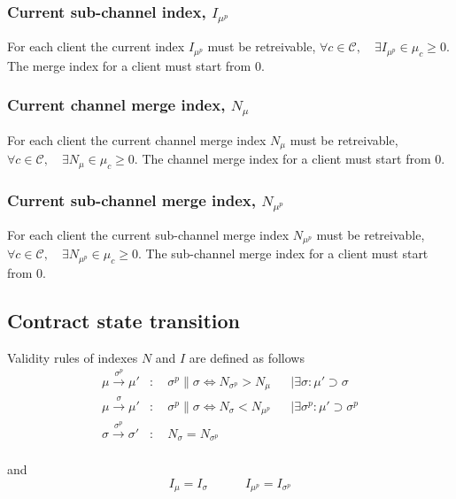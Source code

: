 \documentclass{llncs}
\begin{document}
\subsubsection{Current sub-channel index, $I_{\mu^p}$} For each client the current index $I_{\mu^p}$ must be retreivable, $\forall c \in \mathcal{C}, \quad \exists I_{\mu^p} \in \mu_c \geq 0$. The merge index for a client must start from 0.

\subsubsection{Current channel merge index, $N_{\mu}$} For each client the current channel merge index $N_{\mu}$ must be retreivable, $\forall c \in \mathcal{C}, \quad \exists N_{\mu} \in \mu_c \geq 0$. The channel merge index for a client must start from 0.

\subsubsection{Current sub-channel merge index, $N_{\mu^p}$} For each client the current sub-channel merge index $N_{\mu^p}$ must be retreivable, $\forall c \in \mathcal{C}, \quad \exists N_{\mu^p} \in \mu_c \geq 0$. The sub-channel merge index for a client must start from 0.

\subsection{Contract state transition} Validity rules of indexes $N$ and $I$ are defined as follows
\begin{align*}
    \mu \xrightarrow{\sigma^p} \mu' &: \quad \sigma^p \parallel \sigma \iff N_{\sigma^p} > N_\mu& &\mid \exists \sigma :  \mu' \supset \sigma \\
    \mu \xrightarrow{\sigma} \mu' &: \quad \sigma^p \parallel \sigma \iff N_{\sigma} < N_{\mu^p}& &\mid \exists \sigma^p : \mu' \supset \sigma^p \\
    \sigma \xrightarrow{\sigma^p} \sigma' &: \quad N_\sigma = N_{\sigma^p} && \\
\end{align*}

and
$$I_\mu = I_\sigma \quad\quad\quad  I_{\mu^p} = I_{\sigma^p}$$



%
%
\printbibliography
\end{document}
